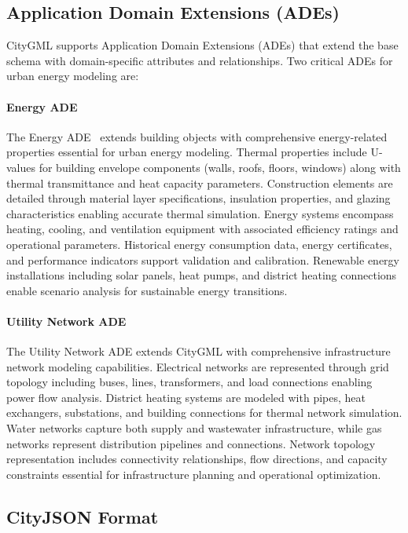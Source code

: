 \subsection{Application Domain Extensions (ADEs)}

CityGML supports Application Domain Extensions (ADEs) that extend the base schema with domain-specific attributes and relationships. Two critical ADEs for urban energy modeling are:

\paragraph{Energy ADE}

The Energy ADE~\cite{energy_ade} extends building objects with comprehensive energy-related properties essential for urban energy modeling. Thermal properties include U-values for building envelope components (walls, roofs, floors, windows) along with thermal transmittance and heat capacity parameters. Construction elements are detailed through material layer specifications, insulation properties, and glazing characteristics enabling accurate thermal simulation. Energy systems encompass heating, cooling, and ventilation equipment with associated efficiency ratings and operational parameters. Historical energy consumption data, energy certificates, and performance indicators support validation and calibration. Renewable energy installations including solar panels, heat pumps, and district heating connections enable scenario analysis for sustainable energy transitions.

\paragraph{Utility Network ADE}

The Utility Network ADE extends CityGML with comprehensive infrastructure network modeling capabilities. Electrical networks are represented through grid topology including buses, lines, transformers, and load connections enabling power flow analysis. District heating systems are modeled with pipes, heat exchangers, substations, and building connections for thermal network simulation. Water networks capture both supply and wastewater infrastructure, while gas networks represent distribution pipelines and connections. Network topology representation includes connectivity relationships, flow directions, and capacity constraints essential for infrastructure planning and operational optimization.

\subsection{CityJSON Format}

